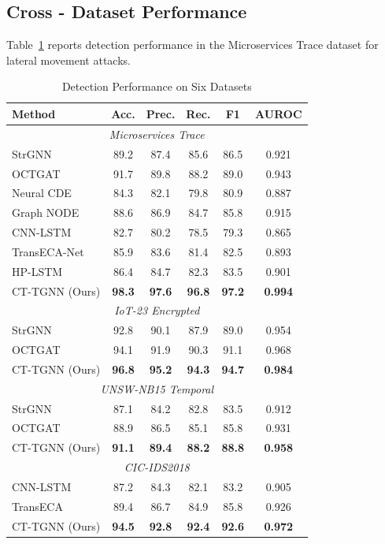 \documentclass[lettersize,journal]{IEEEtran}
\begin{document}
\subsection{Cross - Dataset Performance}

Table~\ref{tab:microservices_results} reports detection performance in the Microservices Trace dataset for lateral movement attacks.

\begin{table}[t]
\centering
\caption{Detection Performance on Six Datasets}
\label{tab:microservices_results}
\small
\setlength{\tabcolsep}{3.5pt} %
\renewcommand{\arraystretch}{1.05}
\begin{tabularx}{\columnwidth}{@{}Xccccc@{}}
\toprule
Method & Acc. & Prec. & Rec. & F1 & AUROC \\
\midrule
\multicolumn{6}{c}{\textit{Microservices Trace}} \\
\midrule
StrGNN & 89.2 & 87.4 & 85.6 & 86.5 & 0.921 \\
OCTGAT & 91.7 & 89.8 & 88.2 & 89.0 & 0.943 \\
Neural CDE & 84.3 & 82.1 & 79.8 & 80.9 & 0.887 \\
Graph NODE & 88.6 & 86.9 & 84.7 & 85.8 & 0.915 \\
CNN-LSTM & 82.7 & 80.2 & 78.5 & 79.3 & 0.865 \\
TransECA-Net & 85.9 & 83.6 & 81.4 & 82.5 & 0.893 \\
HP-LSTM & 86.4 & 84.7 & 82.3 & 83.5 & 0.901 \\
CT-TGNN (Ours) & \textbf{98.3} & \textbf{97.6} & \textbf{96.8} & \textbf{97.2} & \textbf{0.994} \\
\midrule
\multicolumn{6}{c}{\textit{IoT-23 Encrypted}} \\
\midrule
StrGNN & 92.8 & 90.1 & 87.9 & 89.0 & 0.954 \\
OCTGAT & 94.1 & 91.9 & 90.3 & 91.1 & 0.968 \\
CT-TGNN (Ours) & \textbf{96.8} & \textbf{95.2} & \textbf{94.3} & \textbf{94.7} & \textbf{0.984} \\
\midrule
\multicolumn{6}{c}{\textit{UNSW-NB15 Temporal}} \\
\midrule
StrGNN & 87.1 & 84.2 & 82.8 & 83.5 & 0.912 \\
OCTGAT & 88.9 & 86.5 & 85.1 & 85.8 & 0.931 \\
CT-TGNN (Ours) & \textbf{91.1} & \textbf{89.4} & \textbf{88.2} & \textbf{88.8} & \textbf{0.958} \\
\midrule
\multicolumn{6}{c}{\textit{CIC-IDS2018}} \\
\midrule
CNN-LSTM & 87.2 & 84.3 & 82.1 & 83.2 & 0.905 \\
TransECA & 89.4 & 86.7 & 84.9 & 85.8 & 0.926 \\
CT-TGNN (Ours) & \textbf{94.5} & \textbf{92.8} & \textbf{92.4} & \textbf{92.6} & \textbf{0.972} \\
\bottomrule
\end{tabularx}
\end{table}
\end{document}

